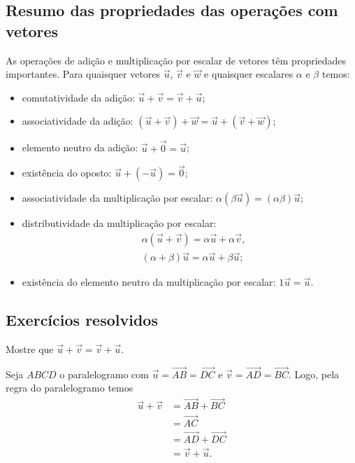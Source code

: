 \subsection{Resumo das propriedades das operações com vetores}

As operações de adição e multiplicação por escalar de vetores têm propriedades importantes. Para quaisquer vetores $\vec{u}$, $\vec{v}$ e $\vec{w}$ e quaisquer escalares $\alpha$ e $\beta$ temos:
\begin{itemize}
\item comutatividade da adição: $\vec{u}+\vec{v}=\vec{v}+\vec{u}$;
\item associatividade da adição: $(\vec{u} + \vec{v}) + \vec{w} = \vec{u} + (\vec{v} + \vec{w})$;
\item elemento neutro da adição: $\vec{u}+\vec{0}=\vec{u}$;
\item existência do oposto: $\vec{u}+(-\vec{u}) = \vec{0}$;
\item associatividade da multiplicação por escalar: $\alpha(\beta\vec{u})=(\alpha\beta)\vec{u}$;
\item distributividade da multiplicação por escalar:
  \begin{align}
    &\alpha(\vec{u}+\vec{v}) = \alpha\vec{u}+\alpha\vec{v},\\
    &(\alpha+\beta)\vec{u} = \alpha\vec{u}+\beta\vec{u};
  \end{align}
\item existência do elemento neutro da multiplicação por escalar: $1\vec{u}=\vec{u}$.
\end{itemize}

\subsection*{Exercícios resolvidos}

\begin{exeresol}\label{exeresol:vetor_comuta_adicao}
  Mostre que $\vec{u} + \vec{v} = \vec{v} + \vec{u}$.
\end{exeresol}
\begin{resol}
  Seja $ABCD$ o paralelogramo com $\vec{u} = \overrightarrow{AB} = \overrightarrow{DC}$ e $\vec{v} = \overrightarrow{AD} = \overrightarrow{BC}$. Logo, pela regra do paralelogramo temos
  \begin{align}
    \vec{u} + \vec{v} &= \overrightarrow{AB} + \overrightarrow{BC} \\
                      &= \overrightarrow{AC} \\
                      &= \overrightarrow{AD} + \overrightarrow{DC} \\
                      &= \vec{v} + \vec{u}.
  \end{align}
\end{resol}

